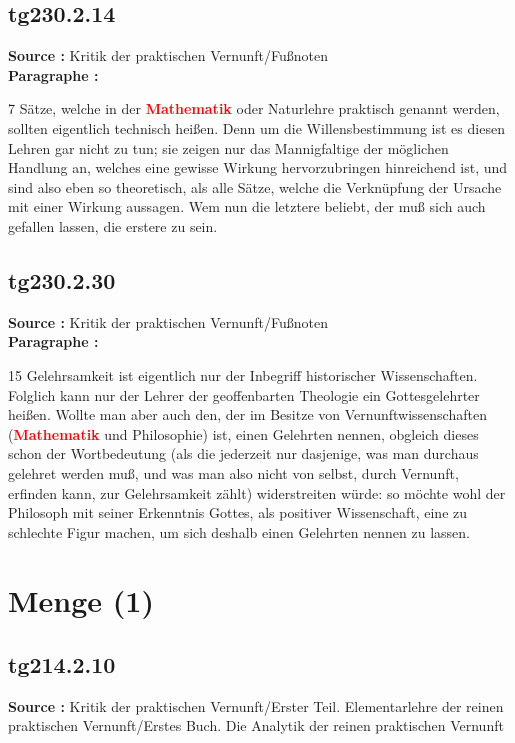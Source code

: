 \documentclass[a4paper,12pt,twoside]{book}
\newcommand{\match}[1]{\textcolor{red}{\textbf{#1}}}
\newcommand{\unnumberedsection}[1]{
	\section*{#1}
	\addcontentsline{toc}{section}{#1}
	\markright{#1}
}
\begin{document}
	\subsection*{tg230.2.14} 
	\textbf{Source : }Kritik der praktischen Vernunft/Fußnoten\\  
	
	\noindent\textbf{Paragraphe : }
	
	7 Sätze, welche in der \match{Mathematik} oder Naturlehre praktisch genannt werden, sollten eigentlich technisch heißen. Denn um die Willensbestimmung ist es diesen Lehren gar nicht zu tun; sie zeigen nur das Mannigfaltige der möglichen Handlung an, welches eine gewisse Wirkung hervorzubringen hinreichend ist, und sind also eben so theoretisch, als alle Sätze, welche die Verknüpfung der Ursache mit einer Wirkung aussagen. Wem nun die letztere beliebt, der muß sich auch gefallen lassen, die erstere zu sein. 
	
	\subsection*{tg230.2.30} 
	\textbf{Source : }Kritik der praktischen Vernunft/Fußnoten\\  
	
	\noindent\textbf{Paragraphe : }
	
	15
	Gelehrsamkeit ist eigentlich nur der Inbegriff historischer Wissenschaften. Folglich kann nur der Lehrer der geoffenbarten Theologie ein Gottesgelehrter heißen. Wollte man aber auch den, der im Besitze von Vernunftwissenschaften (\match{Mathematik} und Philosophie) ist, einen Gelehrten nennen, obgleich dieses schon der Wortbedeutung (als die jederzeit nur dasjenige, was man durchaus gelehret werden muß, und was man also nicht von selbst, durch Vernunft, erfinden kann, zur Gelehrsamkeit zählt) widerstreiten würde: so möchte wohl der Philosoph mit seiner Erkenntnis Gottes, als positiver Wissenschaft, eine zu schlechte Figur machen, um sich deshalb einen Gelehrten nennen zu lassen. 
	
	\unnumberedsection{Menge (1)} 
	\subsection*{tg214.2.10} 
	\textbf{Source : }Kritik der praktischen Vernunft/Erster Teil. Elementarlehre der reinen praktischen Vernunft/Erstes Buch. Die Analytik der reinen praktischen Vernunft\\  
	
\end{document}
